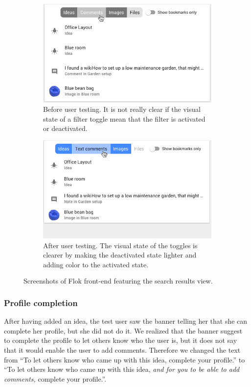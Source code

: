 \documentclass[a4paper,12pt,twoside]{article}
\begin{document}
\begin{figure}[!htb]
    \begin{subfigure}[t]{.495\textwidth}
        \includegraphics[width=\textwidth]{images/user_tests/search_before.png}
        \caption{Before user testing. It is not really clear if the visual state of a filter toggle mean that the filter is activated or deactivated.}
        \label{fig.tests.search.before}
    \end{subfigure}
    \hfill
    \begin{subfigure}[t]{.495\textwidth}
        \includegraphics[width=\textwidth]{images/user_tests/search_after.png}
        \caption{After user testing. The visual state of the toggles is clearer by making the deactivated state lighter and adding color to the activated state.}
        \label{fig.tests.search.after}
    \end{subfigure}
    \caption{Screenshots of Flok front-end featuring the search results view.}
    \label{fig.tests.search}
\end{figure}

\subsubsection*{Profile completion}
After having added an idea, the test user saw the banner telling her that she can complete her profile, but she did not do it.
We realized that the banner suggest to complete the profile to let others know who the user is, but it does not say that it would enable the user to add comments.
Therefore we changed the text from “To let others know who came up with this idea, complete your profile.” to “To let others know who came up with this idea, \emph{and for you to be able to add comments,} complete your profile.”.
\end{document}
